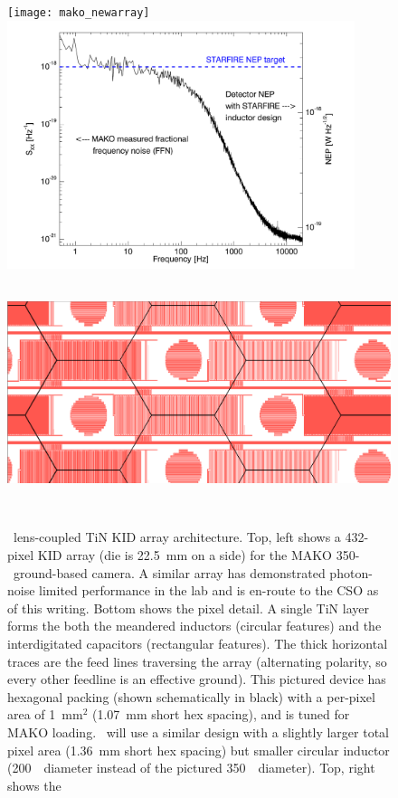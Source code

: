 \begin{figure}[t!]
\begin{center}
\texttt{[image: mako\_newarray]}
\includegraphics*[height=7.25cm,trim=1cm 0.2cm 1cm 0.5cm]{icaris_nep}
\includegraphics*[height=7cm,trim= 9cm 5.5cm 16cm 8.2cm]{mako_new_ledit}\\
\captionbaseline\caption{\small  \icaris\ lens-coupled TiN KID array architecture.   Top, left shows a 432-pixel KID array (die is 22.5~mm on a side) for the MAKO 350-\mum\ ground-based camera.  A similar array has demonstrated photon-noise limited performance in the lab and is en-route to the CSO as of this writing.  Bottom shows the pixel detail.  A single TiN layer forms the both the meandered inductors (circular features) and the interdigitated capacitors (rectangular features).  The thick horizontal traces are the feed lines traversing the array (alternating polarity, so every other feedline is an effective ground).  This pictured device has hexagonal packing (shown schematically in black) with a per-pixel area of 1~mm$^2$ (1.07~mm short hex spacing), and is tuned for MAKO loading.  \icaris\ will use a similar design with a slightly larger total pixel area (1.36~mm short hex spacing) but smaller circular inductor (200~\mum\ diameter instead of the pictured 350~\mum\ diameter).  Top, right shows the 
}
\end{center}
\end{figure}
